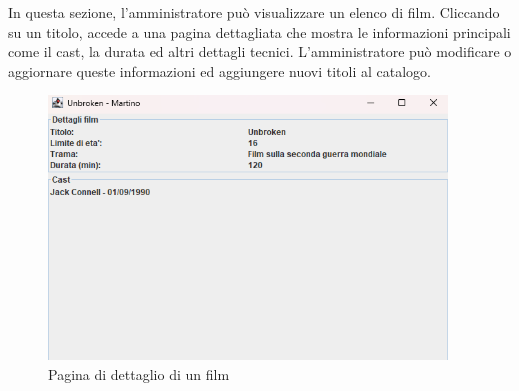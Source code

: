 \documentclass[a4paper,12pt]{report}
\begin{document}
In questa sezione, l'amministratore può visualizzare un elenco di film. Cliccando su un titolo, accede a una pagina dettagliata che mostra le informazioni principali come il cast, la durata ed altri dettagli tecnici. L'amministratore può modificare o aggiornare queste informazioni ed aggiungere nuovi titoli al catalogo. \\
\begin{figure}[H]
	\centering
	\includegraphics[width=300pt]{appimg/adminImages/dettaglifilm.png}
	\caption{Pagina di dettaglio di un film}
\end{figure}
\end{document}

